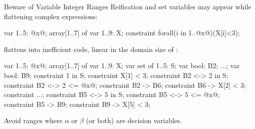 \documentclass{cons-beamer}
\begin{document}
\begin{flashcardminizinc}
\begin{frame}[fragile]{Beware of Variable Integer Ranges}
  Reification and set variables may appear while flattening complex
  expressions:
  \begin{example}
    \vspace{-3mm}
    \footnotesize
    \begin{mznno}
var 1..5: @x@;  array[1..7] of var 1..9: X;
constraint forall(i in 1..@x@)(X[i]<3);
    \end{mznno}\normalsize
    \vspace{-1mm}
    flattens into inefficient code, linear in the domain size of
    : 
    \vspace{-1mm}
    \footnotesize
    \begin{mznno}
var 1..5: @x@;  array[1..7] of var 1..9: X;
var set of 1..5: S; %
var bool: B2; ...; var bool: B9;
constraint        1 in S; constraint  X[1] < 3;
constraint B2 <-> 2 in S; constraint B2 <-> 2 <= @x@;
constraint B2 -> B6; constraint B6 -> X[2] < 3;
constraint ...;
constraint B5 <-> 5 in S; constraint B5 <-> 5 <= @x@;
constraint B5 -> B9; constraint B9 -> X[5] < 3;
    \end{mznno}
    \vspace{-3mm}
  \end{example}\normalsize
  \alert{Avoid ranges  where $\alpha$ or
    $\beta$ (or both) are decision variables.}
\end{frame}


\end{flashcardminizinc}
\end{document}
